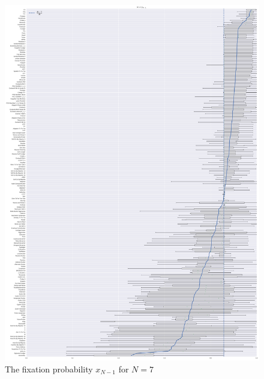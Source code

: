 \documentclass{article}
\begin{document}
\begin{figure}[!hbtp]
    \centering
    \includegraphics[height=.8\textheight]{./img/boxplot_7_resist.pdf}
    \caption{The fixation probability \(x_{N-1}\) for \(N=7\)}
    \label{fig:boxplot_6_resist}
\end{figure}
\end{document}
